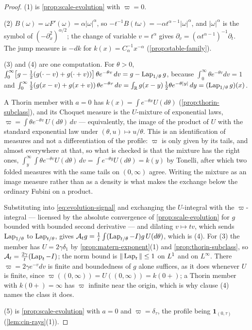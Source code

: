 \begin{proof}
\leanok
(1) is \ref{prop:scale-evolution} with $\varpi = 0$.

(2) $B(\omega) = \omega F'(\omega) = \alpha|\omega|^\alpha$, so
$-t^{-1}B(t\omega) = -\alpha t^{\alpha-1}|\omega|^\alpha$, and $|\omega|^\alpha$ is the symbol
of $(-\partial_x^2)^{\alpha/2}$; the change of variable $v = t^\alpha$ gives
$\partial_v = (\alpha t^{\alpha-1})^{-1}\partial_t$. The jump measure is $-dk$ for
$k(x) = C_\alpha^{-1}x^{-\alpha}$ (\ref{prop:stable-family}).

(3) and (4) are one computation. For $\theta > 0$,
$\int_0^\infty \bigl[g - \tfrac12(g(\cdot - v) + g(\cdot + v))\bigr]\,\theta e^{-\theta v}\,dv
= g - \operatorname{Lap}_{1/\theta}g$, because $\int_0^\infty \theta e^{-\theta v}dv = 1$ and
$\int_0^\infty \tfrac12(g(x-v)+g(x+v))\,\theta e^{-\theta v}\,dv
= \int_{\mathbb{R}} g(x-y)\,\tfrac12\theta e^{-\theta|y|}\,dy = (\operatorname{Lap}_{1/\theta}g)(x)$.

A Thorin member with $a = 0$ has $k(x) = \int e^{-\theta x}U(d\theta)$
(\ref{prop:thorin-subclass}), and its Choquet measure is the $U$-mixture of exponential laws,
$\varpi = \int \theta e^{-\theta v}\,U(d\theta)\,dv$ --- equivalently, the image of the product
of $U$ with the standard exponential law under $(\theta,u) \mapsto u/\theta$. This is an
identification of
measures and not a differentiation of the profile: $\varpi$ is only given by its tails, and
almost everywhere at that, so what is checked is that the mixture has the right ones,
$\int_y^\infty\!\int \theta e^{-\theta v}U(d\theta)\,dv = \int e^{-\theta y}U(d\theta) = k(y)$
by Tonelli, after which two folded measures with the same tails on $(0,\infty)$ agree. Writing
the mixture as an image measure rather than as a density is what makes the exchange below the
ordinary Fubini on a product.

Substituting into \ref{eq:evolution-signal} and exchanging the $U$-integral with the
$\varpi$-integral --- licensed by the absolute convergence of \ref{prop:scale-evolution} for $g$
bounded with bounded second derivative --- and dilating $v \mapsto tv$, which sends
$\operatorname{Lap}_{1/\theta}$ to $\operatorname{Lap}_{t/\theta}$, gives
$\mathcal{A}_tg = \tfrac1t\int (\operatorname{Lap}_{t/\theta} - I)g\,U(d\theta)$, which is (4). For (3) the
\Matern{} member has $U = 2\gamma\delta_1$ by \ref{prop:matern-exponent}(1) and
\ref{prop:thorin-subclass}, so $\mathcal{A}_t = \tfrac{2\gamma}{t}(\operatorname{Lap}_t - I)$; the norm bound
is $\|\operatorname{Lap}_t\| \le 1$ on $L^1$ and on $L^\infty$. There $\varpi = 2\gamma e^{-v}dv$ is finite
and boundedness of $g$ alone suffices, as it does whenever $U$ is finite, since
$\varpi((0,\infty)) = U((0,\infty)) = k(0{+})$; a Thorin member with $k(0{+}) = \infty$ has
$\varpi$ infinite near the origin, which is why clause (4) names the class it does.

(5) is \ref{prop:scale-evolution} with $a = 0$ and $\varpi = \delta_\tau$, the profile being
$\mathbf 1_{(0,\tau)}$ (\ref{lem:cin-rays}(1)).
\end{proof}
